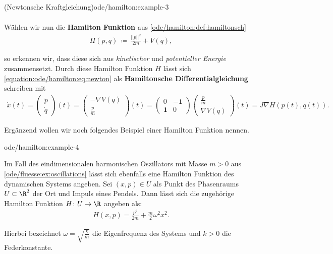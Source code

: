 \documentclass[letterpaper,10pt,german]{jupyterBook}
\begin{document}
\begin{example}{(Newtonsche Kraftgleichung)}{ode/hamilton:example-3}
\begin{align}
\end{align}
\par
Wählen wir nun die \textbf{Hamilton Funktion} aus \cref{ode/hamilton:def:hamiltonsch} \begin{align*}
H(p,q) \, \coloneqq \, \frac{||p||^2}{2m} + V(q),
\end{align*}
\par
so erkennen wir, dass diese sich aus \emph{kinetischer} und \emph{potentieller Energie} zusammensetzt.
Durch diese Hamilton Funktion \(H\) lässt sich \eqref{equation:ode/hamilton:eq:newton} als \textbf{Hamiltonsche Differentialgleichung} schreiben mit
\begin{align*}
\dot{x}(t) = \begin{pmatrix}\dot{p} \\ \dot{q} \end{pmatrix}(t) = \begin{pmatrix} -\nabla V(q) \\ \frac{p}{m} \end{pmatrix}(t) = \begin{pmatrix}0 & -\mathbf{1}\\ \mathbf{1} & 0 \end{pmatrix} \begin{pmatrix} \frac{p}{m} \\ \nabla V(q) \end{pmatrix}(t) = J \nabla H(p(t),q(t)).
\end{align*}\end{example}

\par
Ergänzend wollen wir noch folgendes Beispiel einer Hamilton Funktion nennen.
\begin{example}{}{ode/hamilton:example-4}



\par
Im Fall des eindimensionalen harmonischen Oszillators mit Masse \(m > 0\) aus \cref{ode/fluesse:ex:oscillations} lässt sich ebenfalls eine Hamilton Funktion des dynamischen Systems angeben.
Sei \((x,p) \in U\) als Punkt des Phasenraums \(U \subset \R^2\) der Ort und Impuls eines Pendels.
Dann lässt sich die zugehörige Hamilton Funktion \(H \colon U \rightarrow \R\) angeben als:
\begin{align*}
H(x,p) = \frac{p^2}{2m} + \frac{m}{2} \omega^2 x^2.
\end{align*}
\par
Hierbei bezeichnet \(\omega = \sqrt{\frac{k}{m}}\) die Eigenfrequenz des Systems und \(k > 0\) die Federkonstante.
\end{example}
\end{document}
